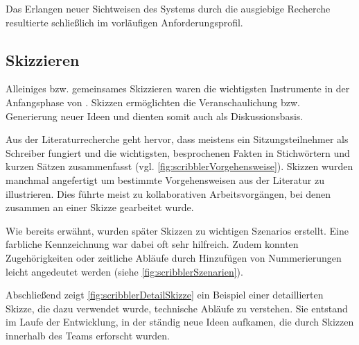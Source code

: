 \medskip Das Erlangen neuer Sichtweisen des Systems durch die ausgiebige Recherche resultierte schließlich im vorläufigen Anforderungsprofil.

\subsection{Skizzieren}
Alleiniges bzw. gemeinsames Skizzieren waren die wichtigsten Instrumente in der Anfangsphase von \scribbler. Skizzen ermöglichten die Veranschaulichung bzw. Generierung neuer Ideen und dienten somit auch als Diskussionsbasis. 

Aus der Literaturrecherche geht hervor, dass meistens ein Sitzungsteilnehmer als Schreiber fungiert und die wichtigsten, besprochenen Fakten in Stichwörtern und kurzen Sätzen zusammenfasst (vgl. \autoref{fig:scribblerVorgehensweise}). Skizzen wurden manchmal angefertigt um bestimmte Vorgehensweisen aus der Literatur zu illustrieren. Dies führte meist zu kollaborativen Arbeitsvorgängen, bei denen zusammen an einer Skizze gearbeitet wurde. 

\medskip Wie bereits erwähnt, wurden später Skizzen zu wichtigen Szenarios erstellt. Eine farbliche Kennzeichnung war dabei oft sehr hilfreich. Zudem konnten Zugehörigkeiten oder zeitliche Abläufe durch Hinzufügen von Nummerierungen leicht angedeutet werden (siehe \autoref{fig:scribblerSzenarien}).

\medskip Abschließend zeigt \autoref{fig:scribblerDetailSkizze} ein Beispiel einer detaillierten Skizze, die dazu verwendet wurde, technische Abläufe zu verstehen. Sie entstand im Laufe der Entwicklung, in der ständig neue Ideen aufkamen, die durch Skizzen innerhalb des Teams erforscht wurden.

